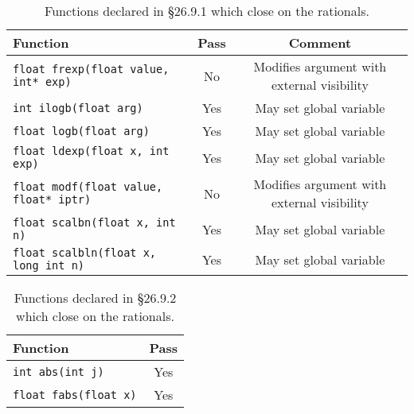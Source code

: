 \documentclass[prd,preprint,amsmath,amssymb,nofootinbib,eqsecnum]{revtex4-1}
\newcommand{\code}[1]{{\tt #1}}
\begin{document}
\begin{table}[h]
	\begin{tabular}{lcc}
		Function & Pass & Comment
	\\
	\hline \hline
		\code{float frexp(float value, int* exp)} & No & Modifies argument with external visibility
	\\
	\hline
		\code{int ilogb(float arg)} & Yes & May set global variable
	\\
	\hline
		\code{float logb(float arg)} & Yes & May set global variable
	\\
	\hline
		\code{float ldexp(float x, int exp)} & Yes & May set global variable
	\\
	\hline
		\code{float modf(float value, float* iptr)} & No & Modifies argument with external visibility
	\\
	\hline
		\code {float scalbn(float x, int n)} & Yes & May set global variable
	\\
	\hline
		\code {float scalbln(float x, long int n)} & Yes & May set global variable
	\end{tabular}
\caption{Functions declared in \S 26.9.1 which close on the rationals.}
\label{tab:26.9.1}
\end{table}


\begin{table}[h]
	\begin{tabular}{lc}
		Function & Pass
	\\
	\hline \hline
		\code{int abs(int j)} & Yes
	\\
	\hline
		\code{float fabs(float x)} & Yes
	\end{tabular}
\caption{Functions declared in \S 26.9.2 which close on the rationals.}
\label{tab:26.9.2}
\end{table}
\end{document}

